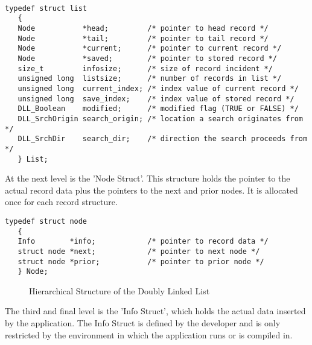 \documentclass[10pt,letterpaper,titlepage]{article}
\begin{document}
\small
\begin{verbatim}

typedef struct list
   {
   Node           *head;         /* pointer to head record */
   Node           *tail;         /* pointer to tail record */
   Node           *current;      /* pointer to current record */
   Node           *saved;        /* pointer to stored record */
   size_t         infosize;      /* size of record incident */
   unsigned long  listsize;      /* number of records in list */
   unsigned long  current_index; /* index value of current record */
   unsigned long  save_index;    /* index value of stored record */
   DLL_Boolean    modified;      /* modified flag (TRUE or FALSE) */
   DLL_SrchOrigin search_origin; /* location a search originates from */
   DLL_SrchDir    search_dir;    /* direction the search proceeds from */
   } List;
\end{verbatim}
\normalsize
\vspace{8pt}

\noindent
At the next level is the 'Node Struct'.  This structure holds the pointer to the actual record data plus the pointers to the next and prior nodes.  It is allocated once for each record structure.

\small
\begin{verbatim}
typedef struct node
   {
   Info        *info;            /* pointer to record data */
   struct node *next;            /* pointer to next node */
   struct node *prior;           /* pointer to prior node */
   } Node;
\end{verbatim}
\normalsize
\vspace{8pt}

\begin{figure}
\begin{center}
\graphicspath{{.}}
\vspace{8pt}

Hierarchical Structure of the Doubly Linked List
\end{center}
\end{figure}

\pagebreak
\noindent
The third and final level is the 'Info Struct', which holds the actual data inserted by the application.  The Info Struct is defined by the developer and is only restricted by the environment in which the application runs or is compiled in.
\end{document}
